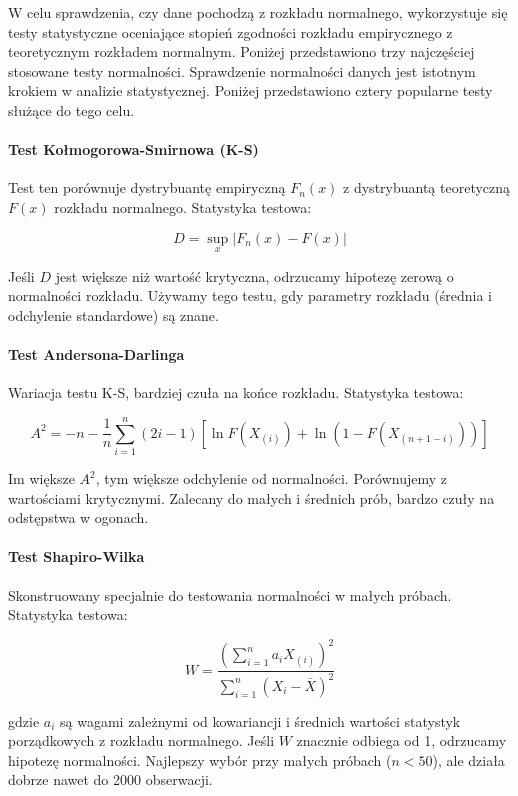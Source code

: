 \documentclass[12pt,a4paper]{article}
\begin{document}
W celu sprawdzenia, czy dane pochodzą z rozkładu normalnego, wykorzystuje się testy statystyczne oceniające stopień zgodności rozkładu empirycznego z teoretycznym rozkładem normalnym. Poniżej przedstawiono trzy najczęściej stosowane testy normalności.
Sprawdzenie normalności danych jest istotnym krokiem w analizie statystycznej. Poniżej przedstawiono cztery popularne testy służące do tego celu.

\paragraph{Test Kołmogorowa-Smirnowa (K-S)}
Test ten porównuje dystrybuantę empiryczną $F_n(x)$ z dystrybuantą teoretyczną $F(x)$ rozkładu normalnego. Statystyka testowa:

$$
D = \sup_x |F_n(x) - F(x)|
$$

 Jeśli $D$ jest większe niż wartość krytyczna, odrzucamy hipotezę zerową o normalności rozkładu.
Używamy tego testu, gdy parametry rozkładu (średnia i odchylenie standardowe) są znane.

\paragraph{Test Andersona-Darlinga}

Wariacja testu K-S, bardziej czuła na końce rozkładu. Statystyka testowa:

$$
A^2 = -n - \frac{1}{n} \sum_{i=1}^{n} (2i - 1) \left[\ln F(X_{(i)}) + \ln(1 - F(X_{(n+1-i)}))\right]
$$

Im większe $A^2$, tym większe odchylenie od normalności. Porównujemy z wartościami krytycznymi.
Zalecany do małych i średnich prób, bardzo czuły na odstępstwa w ogonach.

\paragraph{Test Shapiro-Wilka}

Skonstruowany specjalnie do testowania normalności w małych próbach. Statystyka testowa:

$$
W = \frac{\left( \sum_{i=1}^{n} a_i X_{(i)} \right)^2}{\sum_{i=1}^{n} (X_i - \bar{X})^2}
$$

gdzie $a_i$ są wagami zależnymi od kowariancji i średnich wartości statystyk porządkowych z rozkładu normalnego.
Jeśli $W$ znacznie odbiega od 1, odrzucamy hipotezę normalności.
Najlepszy wybór przy małych próbach ($n < 50$), ale działa dobrze nawet do 2000 obserwacji.
\end{document}
